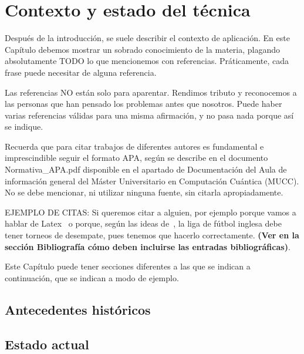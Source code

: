 \chapter{Contexto y estado del técnica}

Después de la introducción, se suele describir el contexto de aplicación. En este Capítulo debemos mostrar un sobrado conocimiento de la materia, plagando absolutamente TODO lo que mencionemos con referencias. Práticamente, cada frase puede necesitar de alguna referencia.

Las referencias NO están solo para aparentar. Rendimos tributo y reconocemos a las personas que han pensado los problemas antes que nosotros. Puede haber varias referencias válidas para una misma afirmación, y no pasa nada porque así se indique.

Recuerda que para citar trabajos de diferentes autores es fundamental e imprescindible seguir el formato APA, según se describe en el documento Normativa\_APA.pdf disponible en el apartado de Documentación del Aula de información general del Máster Universitario en Computación Cuántica (MUCC). No se debe mencionar, ni utilizar ninguna fuente, sin citarla apropiadamente.

EJEMPLO DE CITAS: Si queremos citar a alguien, por ejemplo porque vamos a hablar de Latex~\citep{lamport1994} o porque, según las ideas de~\cite{ackerman2017}, la liga de fútbol inglesa debe tener torneos de desempate, pues tenemos que hacerlo correctamente. \textbf{(Ver en la sección Bibliografía cómo deben incluirse las entradas bibliográficas)}.

Este Capítulo puede tener secciones diferentes a las que se indican a continuación, que se indican a modo de ejemplo.

\section{Antecedentes históricos}

\section{Estado actual}
